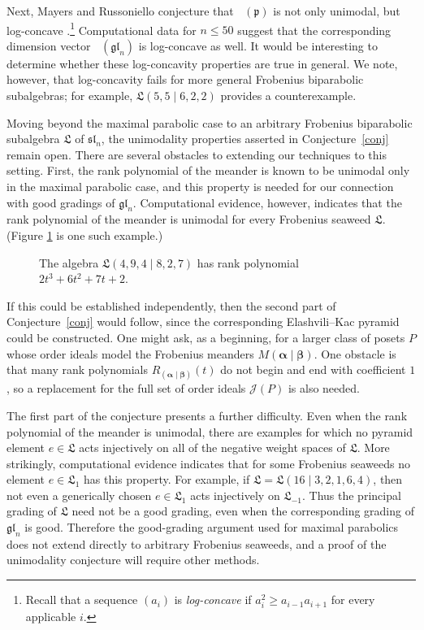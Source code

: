 \documentclass{amsart}
\def\fp{\mathfrak p} %
\def\cJ{\mathcal J}
\def\sl{\mathfrak{sl}}
\def\gl{\mathfrak{gl}}
\def\L{\mathfrak L}
\def\valpha{\boldsymbol{\alpha}}
\def\vbeta{\boldsymbol{\beta}}
\def\sln{\sl_n}
\def\gln{\gl_n}
\def\dimvec{\mathop{\underline{\mathrm{dim}}}}
\theoremstyle{definition}
\begin{document}
Next, Mayers and Russoniello conjecture that $\dimvec(\fp)$ is not only
unimodal, but log-concave 
\cite[Conjecture~75]{mayers2026seaweed}.\footnote{Recall that a sequence $(a_i)$ is \emph{log-concave} if $a_i^2 \geq a_{i-1}a_{i+1}$ for every applicable $i$.}
Computational data for $n\leq 50$ suggest that the corresponding dimension vector $\dimvec(\gln)$ is log-concave as well. It would be interesting to
determine whether these log-concavity properties are true in general. We note, however, that log-concavity fails for
more general Frobenius biparabolic subalgebras; for example,
$\L(5,5\mid 6,2,2)$ provides a counterexample.

Moving beyond the maximal parabolic case to an arbitrary Frobenius
biparabolic subalgebra $\L$ of $\sln$, the unimodality properties
asserted in Conjecture~\ref{conj} remain open. There are several
obstacles to extending our techniques to this setting. First, the rank
polynomial of the meander is known to be unimodal only in the maximal
parabolic case, and this property is needed for our connection with
good gradings of $\gln$. Computational evidence, however, indicates
that the rank polynomial of the meander is unimodal for every
Frobenius seaweed $\L$. (Figure
\ref{fig:R(alpha|beta)} is one such example.)
\begin{figure}[!hbt]
  \centering
  
  \caption{The algebra $\L(4,9,4 \mid 8,2,7)$ has rank polynomial $2t^3+6t^2+7t+2$.}
  \label{fig:R(alpha|beta)}
\end{figure}
If this could be established independently,
then the second part of Conjecture~\ref{conj} would follow, since the
corresponding Elashvili--Kac pyramid could be constructed. One might ask, as a beginning, for a larger class of posets $P$ whose order ideals model the Frobenius meanders $M(\valpha\mid\vbeta)$. One obstacle is that many rank polynomials $R_{(\valpha\mid \vbeta)}(t)$ do not begin and end with coefficient $1$, so a replacement for the full set of order ideals $\cJ(P)$ is also needed. 

The first part of the conjecture presents a further difficulty. Even when the rank polynomial of the meander is unimodal, there are examples for which no
pyramid element $e\in\L$ acts injectively on all of the negative weight spaces of $\L$. More strikingly, computational evidence indicates that for some Frobenius seaweeds no element $e\in\L_1$ has this property. 
For example, if $\L=\L(16\mid 3,2,1,6,4)$,
then not even a generically chosen $e\in\L_1$ acts injectively on $\L_{-1}$.
Thus the principal grading of $\L$ need not be a good grading, even when the corresponding grading of $\gln$ is good. Therefore the good-grading argument used for maximal parabolics does not extend directly to arbitrary Frobenius seaweeds, and a proof of the unimodality conjecture will require other methods.
\end{document}
